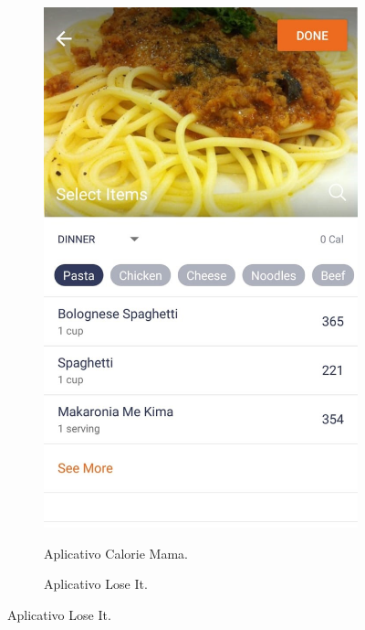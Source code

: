 \begin{figure}[!ht] 
\centering
\caption{Comparação entre os aplicativos.}
\label{fig:apps}
\begin{subfigure}{0.4\textwidth}
  \centering
    \caption{Aplicativo Calorie Mama.}
   \includegraphics[width=\textwidth]{imgs/mama.jpeg}
  \label{fig:subApps1}
\end{subfigure}%
\hspace{.1\textwidth}
\begin{subfigure}{0.4\textwidth}
  \centering
    \caption{Aplicativo Lose It.}

\end{subfigure}
\end{figure}
